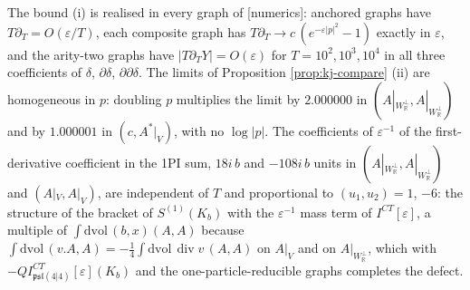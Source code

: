 \begin{remark}[Evidence]
\label{rem:kj-evidence}
The bound (i) is realised in every graph of [numerics]: anchored graphs have $T\partial_T=O(\varepsilon/T)$, each composite graph has $T\partial_T\to c\,(e^{-\varepsilon|p|^2}-1)$ exactly in $\varepsilon$, and the arity-two graphs have $|T\partial_TY|=O(\varepsilon)$ for $T=10^2,10^3,10^4$ in all three coefficients of $\delta$, $\partial\delta$, $\partial\partial\delta$. The limits of Proposition \ref{prop:kj-compare} (ii) are homogeneous in $p$: doubling $p$ multiplies the limit by $2.000000$ in $(A|_{W_{\mathbb R}^\perp},A|_{W_{\mathbb R}^\perp})$ and by $1.000001$ in $(c,A^*|_V)$, with no $\log|p|$. The coefficients of $\varepsilon^{-1}$ of the first-derivative coefficient in the 1PI sum, $18i\,b$ and $-108i\,b$ units in $(A|_{W_{\mathbb R}^\perp},A|_{W_{\mathbb R}^\perp})$ and $(A|_V,A|_V)$, are independent of $T$ and proportional to $(u_1,u_2)=1$, $-6$: the structure of the bracket of $S^{(1)}(K_b)$ with the $\varepsilon^{-1}$ mass term of $I^{CT}[\varepsilon]$, a multiple of $\int\mathrm{dvol}\,(b,x)(A,A)$ because $\int\mathrm{dvol}\,(v.A,A)=-\tfrac14\int\mathrm{dvol}\,\operatorname{div}v\,(A,A)$ on $A|_V$ and on $A|_{W_{\mathbb R}^\perp}$, which with $-QI^{CT}_{\mathfrak{psl}(4|4)}[\varepsilon](K_b)$ and the one-particle-reducible graphs completes the defect.
\end{remark}

